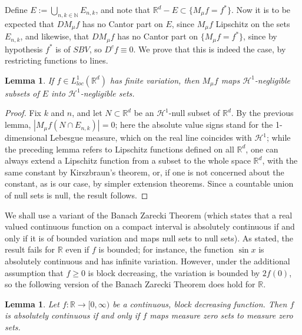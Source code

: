 \documentclass[12pt]{amsart}
\numberwithin{equation}{section}
\theoremstyle{plain}
\newtheorem{lemma}[theorem]{Lemma}
\theoremstyle{definition}
\theoremstyle{remark}
\begin{document}
Define $E:=\bigcup_{n,k\in\mathbb{N}}E_{n,k}$, and note that
$\mathbb{R}^d-E\subset \{M_{\mu}f=f^*\}$. Now it is to be expected
 that $DM_\mu f$
has no Cantor part on  $E$, since
  $M_\mu f$ Lipschitz on the sets $E_{n,k}$, and likewise, that
$DM_\mu f$ has no Cantor part on  $\{M_{\mu}f=f^*\}$, since
by hypothesis $f^*$ is of $SBV$, so $D^c f \equiv 0$. We prove
that this is indeed the case, by restricting
functions to
lines.

 \begin{lemma}\label{lemmatres}
  If $f\in L^1_{loc}(\mathbb{R}^d)$  has finite variation, then $M_\mu f$ maps $\mathcal{H}^{1}$-negligible subsets of $E$ into $\mathcal{H}^{1}$-negligible sets.
\end{lemma}
\begin{proof}  Fix $k$ and $n$, and let $N\subset \mathbb{R}^d$ be an $\mathcal{H}^{1}$-null subset of $\mathbb{R}^d$.
  By
  the previous lemma, $|M_\mu f(N \cap E_{n,k})| = 0$;
  here the absolute value signs stand for the 1-dimensional Lebesgue
  measure, which on the real line coincides with $\mathcal{H}^{1}$; while the preceding lemma refers to Lipschitz functions
  defined on all $\mathbb{R}^d$, one can always extend a
  Lipschitz function from a subset to the whole space $\mathbb{R}^d$,
  with the same constant by Kirszbraun's theorem,
  or, if one is not concerned about the
  constant, as is our case, by simpler extension theorems.
  Since a countable union of null sets is
  null, the result follows.
  \end{proof}

We shall use a variant of the Banach Zarecki Theorem (which states that a
real valued continuous function on a compact interval is
absolutely continuous
if and only if it is  of bounded variation and maps null sets to null sets). As stated, the result fails for $\mathbb{R}$ even if $f$ is bounded; for
instance, the function $\sin x$ is absolutely continuous and has
infinite variation. However, under the additional assumption that $f\ge 0$ is  block decreasing, the variation is bounded by $2 f(0)$,
so the following version of the Banach Zarecki Theorem does
hold
for $\mathbb{R}$.

\begin{lemma}\label{BVAC}
 Let $f:\mathbb{R} \to [0, \infty)$ be a continuous, block decreasing function. Then $f$  is absolutely continuous if and only if
 $f$  maps measure zero sets
to measure zero sets.
\end{lemma}
\end{document}
